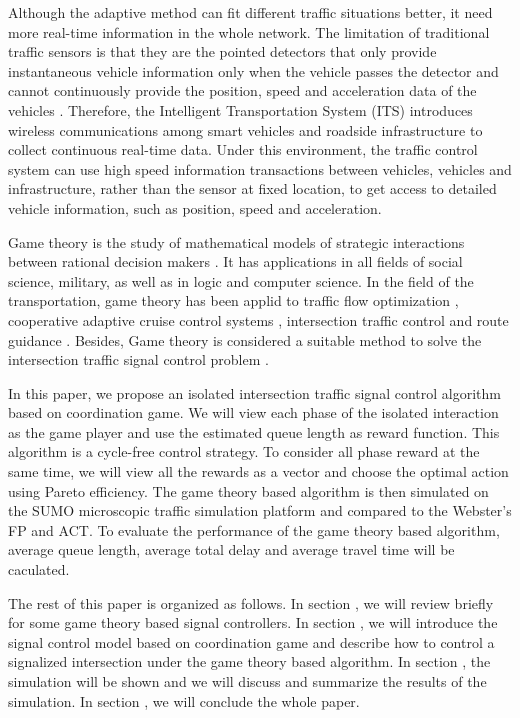 \documentclass[a4paper, 10pt, conference]{ieeeconf}      %
\begin{document}
Although the adaptive method can fit different traffic situations better, it need more real-time information in the whole network. The 
limitation of traditional traffic sensors is that they are the pointed detectors that only provide instantaneous vehicle information
only when the vehicle passes the detector and cannot continuously provide the position, speed and acceleration data of the 
vehicles \cite{feng2015real}. Therefore, the Intelligent Transportation System (ITS) introduces wireless communications among smart vehicles 
and roadside infrastructure to collect continuous real-time data. Under this environment, the traffic control system can use high speed 
information transactions between vehicles, vehicles and infrastructure, rather than the sensor at fixed location, 
to get access to detailed vehicle information, such as position, speed and acceleration. 

Game theory is the study of mathematical models of strategic interactions between rational decision makers \cite{hammerstein1994game}. It has
applications in all fields of social science, military, as well as in logic and computer science. In the field of the transportation, game 
theory has been applid to traffic flow optimization \cite{bui2018cooperative}, cooperative adaptive cruise control 
systems \cite{zohdy2012game}, intersection traffic control \cite{elhenawy2015intersection} and route guidance \cite{jun2003study}.
Besides, Game theory is considered a suitable method to solve the intersection traffic signal control problem \cite{abdelghaffar2016isolated}. 

In this paper, we propose an isolated intersection traffic signal control algorithm based on coordination game. We will view each phase of the 
isolated interaction as the game player and use the estimated queue length as reward function. This algorithm is a cycle-free control strategy. 
To consider all phase reward at the same time, we will view all the rewards as a vector and choose the optimal action using Pareto efficiency. 
The game theory based algorithm is then simulated on the SUMO \cite{SUMO2012} microscopic traffic simulation platform and compared to the 
Webster's FP and ACT. To evaluate the performance of the game theory based algorithm, average queue length, average total delay and average
travel time will be caculated. 

The rest of this paper is organized as follows. In section \uppercase\expandafter{}, we will review briefly for some game theory 
based signal controllers. In section \uppercase\expandafter{}, we will introduce the signal control model based on coordination
game and describe how to control a signalized intersection under the game theory based algorithm. In section \uppercase\expandafter{},
the simulation will be shown and we will discuss and summarize the results of the simulation. In section \uppercase\expandafter{}, 
we will conclude the whole paper. 
\end{document}
